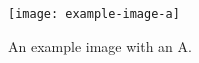 \begin{figure}[t]
    \centering
    \texttt{[image: example-image-a]}
    \caption{An example image with an A.}
    \label{fig:example-a}
\end{figure}